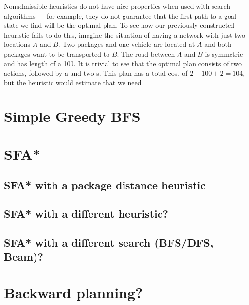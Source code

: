 Nonadmissible heuristics do not have nice properties when used with search algorithms
--- for example, they do not guarantee that the first path to a goal state we find
will be the optimal plan. To see how our previously constructed heuristic fails to do
this, imagine the situation of having a network with just two locations $A$ and $B$.
Two packages and one vehicle are located at $A$ and both packages want to be
transported to $B$. The road between $A$ and $B$ is symmetric and has length
of a 100. It is trivial to see that the optimal plan consists of two \pickup{} actions,
followed by a \drive{} and two \drop{}s. This plan has a total cost of $2+100+2=104$,
but the heuristic would estimate that we need 

\section{Simple Greedy BFS}

 \citep[Section~3.5]{Russell1995}

 \citep{Zhou2015}

\section{SFA*}



\subsection{SFA* with a package distance heuristic}

\subsection{SFA* with a different heuristic?}

\subsection{SFA* with a different search (BFS/DFS, Beam)?}

\section{Backward planning?}

